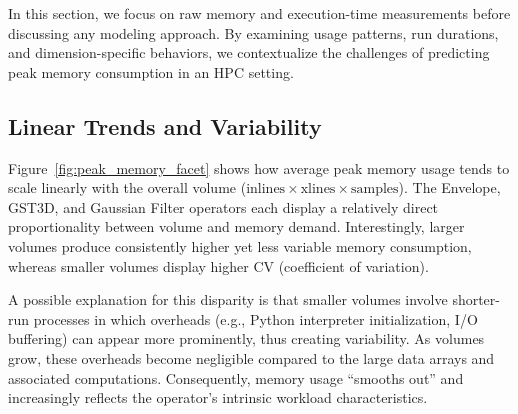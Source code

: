 In this section, we focus on raw memory and execution-time measurements before discussing any modeling approach.
By examining usage patterns, run durations, and dimension-specific behaviors, we contextualize the challenges of predicting peak memory consumption in an \ac{HPC} setting.

\subsection{Linear Trends and Variability}
\label{subsec:linear-trends-and-variability}

Figure~\ref{fig:peak_memory_facet} shows how average peak memory usage tends to scale linearly with the overall volume (\(\text{inlines} \times \text{xlines} \times \text{samples}\)). The Envelope, \ac{GST3D}, and Gaussian Filter operators each display a relatively direct proportionality between volume and memory demand.
Interestingly, larger volumes produce consistently higher yet less variable memory consumption, whereas smaller volumes display higher \ac{CV} (coefficient of variation).

A possible explanation for this disparity is that smaller volumes involve shorter-run processes in which overheads (e.g., Python interpreter initialization, I/O buffering) can appear more prominently, thus creating variability.
As volumes grow, these overheads become negligible compared to the large data arrays and associated computations.
Consequently, memory usage “smooths out” and increasingly reflects the operator’s intrinsic workload characteristics.

